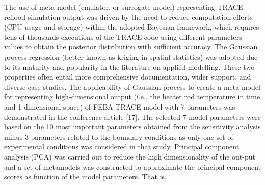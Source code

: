 \documentclass[11pt,titlepage]{article}
\begin{document}
The use of meta-model (emulator, or surrogate model) representing TRACE reflood simulation output was driven by the need to reduce computation efforts (CPU usage and storage) within the adopted Bayesian framework, which requires tens of thousands executions of the TRACE code using different parameters values to obtain the posterior distribution with sufficient accuracy. The Gaussian process regression (better known as kriging in spatial statistics) was adopted due to its maturity and popularity in the literature on applied modelling. These two properties often entail more comprehensive documentation, wider support, and diverse case studies.
The applicability of Gaussian process to create a meta-model for representing high-dimensional output (i.e., the heater rod temperature in time and 1-dimensional space) of FEBA TRACE model with 7 parameters was demonstrated in the conference article [17]. The selected 7 model parameters were based on the 10 most important parameters obtained from the sensitivity analysis minus 3 parameters related to the boundary conditions as only one set of experimental conditions was considered in that study.
Principal component analysis (PCA) was carried out to reduce the high dimensionality of the out-put and a set of metamodels was constructed to approximate the principal component scores as function of the model parameters. That is,


\end{document}
